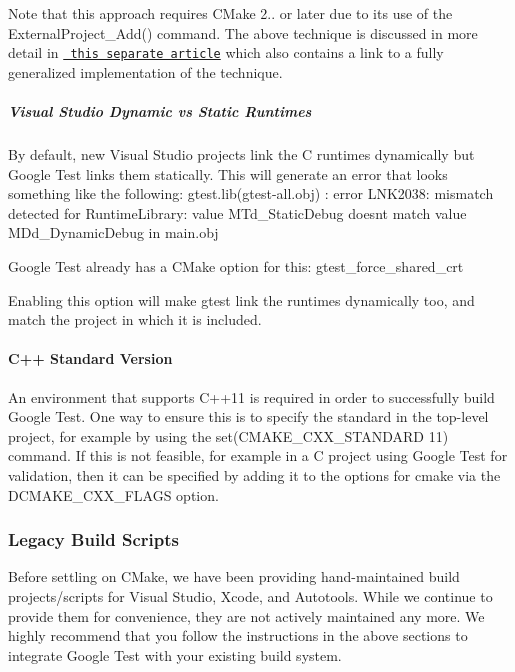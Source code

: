 Note that this approach requires C\+Make 2.. or later due to its use of the {\ttfamily External\+Project\+\_\+\+Add()} command. The above technique is discussed in more detail in \href{http://crascit.com/2015/07/25/cmake-gtest/}{\texttt{ this separate article}} which also contains a link to a fully generalized implementation of the technique.

\subparagraph*{Visual Studio Dynamic vs Static Runtimes}

By default, new Visual Studio projects link the C runtimes dynamically but Google Test links them statically. This will generate an error that looks something like the following\+: gtest.\+lib(gtest-\/all.\+obj) \+: error L\+N\+K2038\+: mismatch detected for \textquotesingle{}Runtime\+Library\textquotesingle{}\+: value \textquotesingle{}M\+Td\+\_\+\+Static\+Debug\textquotesingle{} doesn\textquotesingle{}t match value \textquotesingle{}M\+Dd\+\_\+\+Dynamic\+Debug\textquotesingle{} in main.\+obj

Google Test already has a C\+Make option for this\+: {\ttfamily gtest\+\_\+force\+\_\+shared\+\_\+crt}

Enabling this option will make gtest link the runtimes dynamically too, and match the project in which it is included.

\paragraph*{C++ Standard Version}

An environment that supports C++11 is required in order to successfully build Google Test. One way to ensure this is to specify the standard in the top-\/level project, for example by using the {\ttfamily set(\+C\+M\+A\+K\+E\+\_\+\+C\+X\+X\+\_\+\+S\+T\+A\+N\+D\+A\+R\+D 11)} command. If this is not feasible, for example in a C project using Google Test for validation, then it can be specified by adding it to the options for cmake via the {\ttfamily D\+C\+M\+A\+K\+E\+\_\+\+C\+X\+X\+\_\+\+F\+L\+A\+GS} option.

\subsubsection*{Legacy Build Scripts}

Before settling on C\+Make, we have been providing hand-\/maintained build projects/scripts for Visual Studio, Xcode, and Autotools. While we continue to provide them for convenience, they are not actively maintained any more. We highly recommend that you follow the instructions in the above sections to integrate Google Test with your existing build system.

